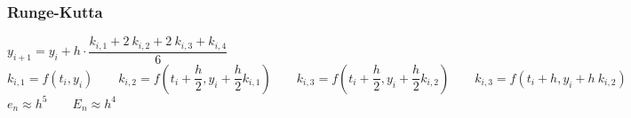 \begin{minipage}{0.6\linewidth}
    \subsubsection{Runge-Kutta}
    $y_{i+1}=y_i + h \cdot \dfrac{k_{i,1} + 2\:k_{i,2} + 2\:k_{i,3} + k_{i,4} }{6}$\\
    $k_{i,1} = f(t_{i},y_{i}) \qquad 
    k_{i,2} = f(t_{i} + \dfrac{h}{2},y_{i} + \dfrac{h}{2}k_{i,1}) \qquad 
    k_{i,3} = f(t_{i} + \dfrac{h}{2},y_{i} + \dfrac{h}{2}k_{i,2}) \qquad 
    k_{i,3} = f(t_{i} + h,y_{i} + h \: k_{i,2}) \qquad$\\
    $e_n \approx h^5 \qquad E_n \approx h^4$
\end{minipage}
\begin{minipage}{0.4\linewidth}
\end{minipage}
